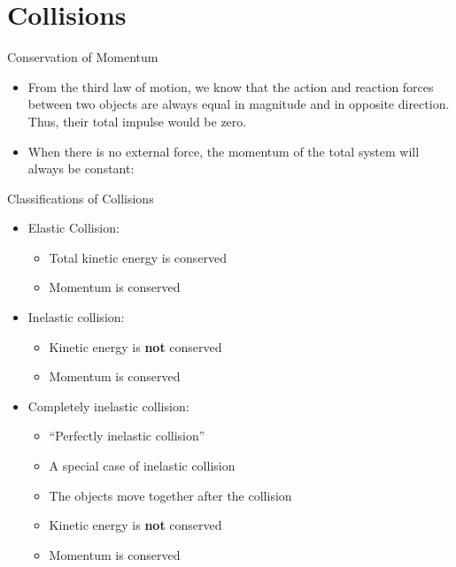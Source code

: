 \documentclass[12pt,compress,aspectratio=169]{beamer}
\begin{document}
\section{Collisions}

\begin{frame}{Conservation of Momentum}
  \begin{itemize}
  \item From the third law of motion, we know that the action and reaction
    forces between two objects are always equal in magnitude and in opposite
    direction. Thus, their total impulse would be zero.
    
  \item When there is no external force, the momentum of the total system will
    always be constant:
    
  \end{itemize}
\end{frame}



\begin{frame}{Classifications of Collisions}
  \begin{itemize}
  \item Elastic Collision:
    \begin{itemize}
    \item Total kinetic energy is conserved
    \item<alert@2> Momentum is conserved
    \end{itemize}
  \item Inelastic collision:
    \begin{itemize}
    \item Kinetic energy is \textbf{not} conserved
    \item<alert@2> Momentum is conserved
    \end{itemize}
  \item Completely inelastic collision:
    \begin{itemize}
    \item ``Perfectly inelastic collision''
    \item A special case of inelastic collision
    \item The objects move together after the collision
    \item Kinetic energy is \textbf{not} conserved
    \item<alert@2> Momentum is conserved
    \end{itemize}
  \end{itemize}
\end{frame}
\end{document}
